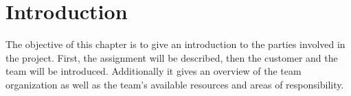 \chapter{Introduction}
The objective of this chapter is to give an introduction to the parties involved in the project. First, the assignment will be described, then the customer and the team will be introduced.
Additionally it gives an overview of the team organization as well as the team's available resources and areas of responsibility.






